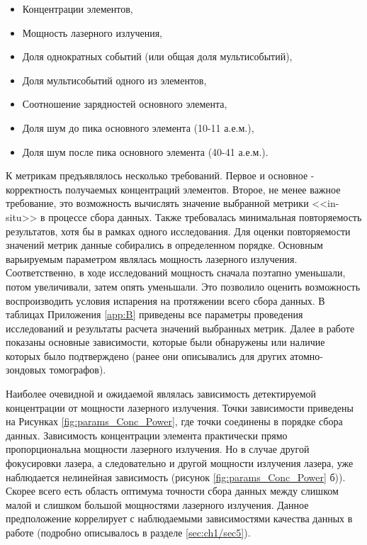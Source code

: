 \begin{itemize}
	\item Концентрации элементов,
	\item Мощность лазерного излучения,
	\item Доля однократных событий (или общая доля мультисобытий),
	\item Доля мультисобытий одного из элементов,
	\item Соотношение зарядностей основного элемента,
	\item Доля шум до пика основного элемента (10-11 а.е.м.),
	\item Доля шум после пика основного элемента (40-41 а.е.м.).		
\end{itemize}

К метрикам предъявлялось несколько требований. Первое и основное - корректность получаемых концентраций элементов. Второе, не менее важное требование, это возможность вычислять значение выбранной метрики <<in-situ>> в процессе сбора данных. Также требовалась минимальная повторяемость результатов, хотя бы в рамках одного исследования. Для оценки повторяемости значений метрик данные собирались в определенном порядке. Основным варьируемым параметром являлась мощность лазерного излучения. Соответственно, в ходе исследований мощность сначала поэтапно уменьшали, потом увеличивали, затем опять уменьшали. Это позволило оценить возможность воспроизводить условия испарения на протяжении всего сбора данных. В таблицах Приложения \cref{app:B} приведены все параметры проведения исследований и результаты расчета значений выбранных метрик. Далее в работе показаны основные зависимости, которые были обнаружены или наличие которых было подтверждено (ранее они описывались для других атомно-зондовых томографов).

Наиболее очевидной и ожидаемой являлась зависимость детектируемой концентрации от мощности лазерного излучения. Точки зависимости приведены на Рисунках  \cref{fig:params_Conc_Power}, где точки соединены в порядке сбора данных.  Зависимость концентрации элемента практически прямо пропорциональна мощности лазерного излучения. Но в случае другой фокусировки лазера, а следовательно и другой мощности излучения лазера, уже наблюдается нелинейная зависимость (рисунок \cref{fig:params_Conc_Power} б)). Скорее всего есть область оптимума точности сбора данных между слишком малой и слишком большой мощностями лазерного излучения. Данное предположение коррелирует с наблюдаемыми зависимостями качества данных в работе \cite{scbibOptParamsYAFI} (подробно описывалось в разделе \cref{sec:ch1/sec5}).

